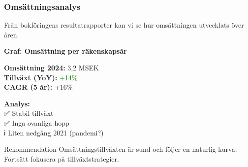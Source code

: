\documentclass[10pt]{beamer}
\begin{document}
\begin{frame}[label=omsattning]
  \frametitle{Omsättningsanalys}
  \small
  Från bokföringens resultatrapporter kan vi se hur omsättningen utvecklats över åren.
  
  \vspace{0.5cm}
  \begin{center}
    \textbf{Graf: Omsättning per räkenskapsår}\\
    \vspace{0.3cm}
  \end{center}
  
  \vspace{0.5cm}
  \begin{minipage}{0.48\textwidth}
    \textbf{Omsättning 2024:} 3,2 MSEK\\
    \textbf{Tillväxt (YoY):} \textcolor{green}{+14\%}\\
    \textbf{CAGR (5 år):} +16\%
  \end{minipage}
  \hfill
  \begin{minipage}{0.48\textwidth}
    \textbf{Analys:}\\
    \footnotesize
    ✅ Stabil tillväxt\\
    ✅ Inga ovanliga hopp\\
    ℹ️ Liten nedgång 2021 (pandemi?)
  \end{minipage}
  
  \vspace{0.5cm}
  \begin{block}{Rekommendation}
    Omsättningstillväxten är sund och följer en naturlig kurva. Fortsätt fokusera på tillväxtstrategier.
  \end{block}
  
  \vspace{0.5cm}
  \begin{flushright}
    \hyperlink{nextslide}{}
  \end{flushright}
\end{frame}
\end{document}
